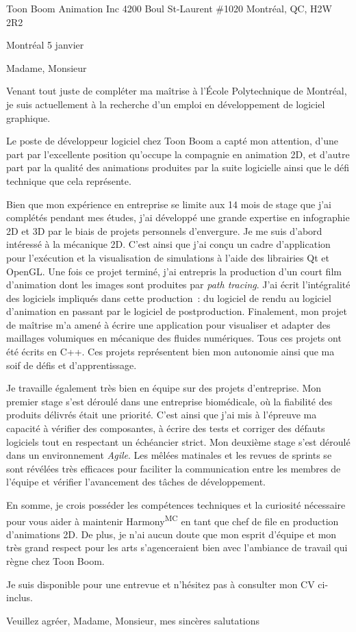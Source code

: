 \insertcvheader

\clurecipient
 {Toon Boom Animation Inc}
 {4200 Boul St-Laurent \#1020}
 {Montréal, QC, H2W 2R2}
 
\cllocationdate
 {Montréal}
 {5 janvier}
 
\clgreeting
 {Madame, Monsieur}
 
Venant tout juste de compléter ma maîtrise à l’École Polytechnique de Montréal, je suis actuellement à la recherche d’un emploi en développement de logiciel graphique.

Le poste de développeur logiciel chez Toon Boom a capté mon attention, d’une part par l’excellente position qu’occupe la compagnie en animation 2D, et d’autre part par la qualité des animations produites par la suite logicielle ainsi que le défi technique que cela représente.
 
Bien que mon expérience en entreprise se limite aux 14 mois de stage que j’ai complétés pendant mes études, j’ai développé une grande expertise en infographie 2D et 3D par le biais de projets personnels d’envergure. Je me suis d’abord intéressé à la mécanique 2D. C’est ainsi que j’ai conçu un cadre d’application pour l’exécution et la visualisation de simulations à l’aide des librairies Qt et OpenGL. Une fois ce projet terminé, j’ai entrepris la production d’un court film d’animation dont les images sont produites par \textit{path tracing}. J’ai écrit l’intégralité des logiciels impliqués dans cette production~: du logiciel de rendu au logiciel d’animation en passant par le logiciel de postproduction. Finalement, mon projet de maîtrise m’a amené à écrire une application pour visualiser et adapter des maillages volumiques en mécanique des fluides numériques. Tous ces projets ont été écrits en C++. Ces projets représentent bien mon autonomie ainsi que ma soif de défis et d’apprentissage.

Je travaille également très bien en équipe sur des projets d’entreprise. Mon premier stage s’est déroulé dans une entreprise biomédicale, où la fiabilité des produits délivrés était une priorité. C’est ainsi que j’ai mis à l’épreuve ma capacité à vérifier des composantes, à écrire des tests et corriger des défauts logiciels tout en respectant un échéancier strict. Mon deuxième stage s’est déroulé dans un environnement \textit{Agile}. Les mêlées matinales et les revues de sprints se sont révélées très efficaces pour faciliter la communication entre les membres de l’équipe et vérifier l’avancement des tâches de développement.

En somme, je crois posséder les compétences techniques et la curiosité nécessaire pour vous aider à maintenir Harmony\textsuperscript{MC} en tant que chef de file en production d’animations 2D. De plus, je n’ai aucun doute que mon esprit d’équipe et mon très grand respect pour les arts s’agenceraient bien avec l’ambiance de travail qui règne chez Toon Boom. 

Je suis disponible pour une entrevue et n’hésitez pas à consulter mon CV ci-inclus.

Veuillez agréer, Madame, Monsieur, mes sincères salutations

